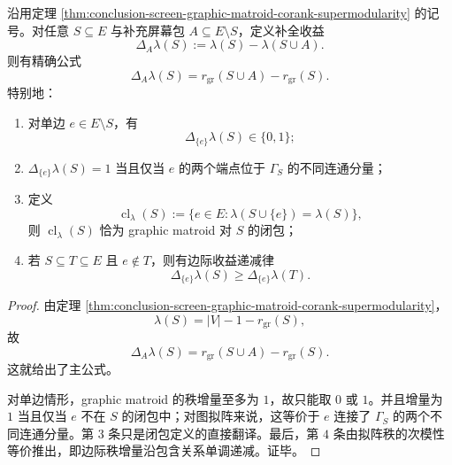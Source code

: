 \begin{theorem}[延迟证书包的相对秩削减律与闭包判据]\label{thm:conclusion-screen-rank-gain-closure-diminishing-returns}
沿用定理 \ref{thm:conclusion-screen-graphic-matroid-corank-supermodularity} 的记号。对任意 \(S\subseteq E\) 与补充屏幕包 \(A\subseteq E\setminus S\)，定义补全收益
\[
\Delta_A\lambda(S):=\lambda(S)-\lambda(S\cup A).
\]
则有精确公式
\[
\Delta_A\lambda(S)=r_{\mathrm{gr}}(S\cup A)-r_{\mathrm{gr}}(S).
\]
特别地：
\begin{enumerate}
  \item 对单边 \(e\in E\setminus S\)，有
        \[
        \Delta_{\{e\}}\lambda(S)\in\{0,1\};
        \]
  \item \(\Delta_{\{e\}}\lambda(S)=1\) 当且仅当 \(e\) 的两个端点位于 \(\Gamma_S\) 的不同连通分量；
  \item 定义
        \[
        \operatorname{cl}_{\lambda}(S):=\{e\in E:\lambda(S\cup\{e\})=\lambda(S)\},
        \]
        则 \(\operatorname{cl}_{\lambda}(S)\) 恰为 graphic matroid 对 \(S\) 的闭包；
  \item 若 \(S\subseteq T\subseteq E\) 且 \(e\notin T\)，则有边际收益递减律
        \[
        \Delta_{\{e\}}\lambda(S)\ge \Delta_{\{e\}}\lambda(T).
        \]
\end{enumerate}
\end{theorem}

\begin{proof}
由定理 \ref{thm:conclusion-screen-graphic-matroid-corank-supermodularity}，
\[
\lambda(S)=|V|-1-r_{\mathrm{gr}}(S),
\]
故
\[
\Delta_A\lambda(S)=r_{\mathrm{gr}}(S\cup A)-r_{\mathrm{gr}}(S).
\]
这就给出了主公式。

对单边情形，graphic matroid 的秩增量至多为 \(1\)，故只能取 \(0\) 或 \(1\)。并且增量为 \(1\) 当且仅当 \(e\) 不在 \(S\) 的闭包中；对图拟阵来说，这等价于 \(e\) 连接了 \(\Gamma_S\) 的两个不同连通分量。第 \(3\) 条只是闭包定义的直接翻译。最后，第 \(4\) 条由拟阵秩的次模性等价推出，即边际秩增量沿包含关系单调递减。证毕。
\end{proof}

